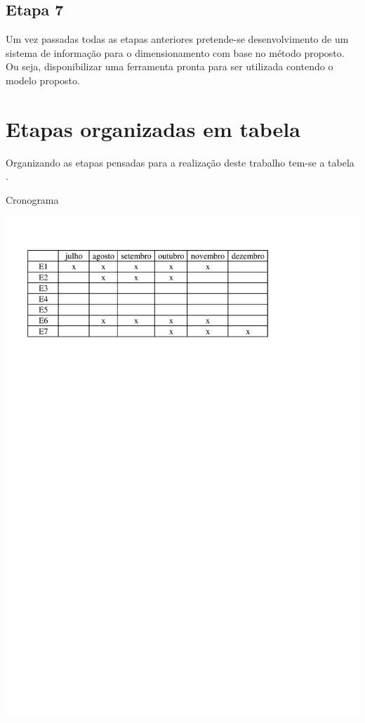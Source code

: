 \documentclass[
	12pt,				%
	openright,			%
	twoside,			%
	a4paper,			%
	english,			%
	french,				%
	spanish,			%
	brazil				%
	]{abntex2}
\begin{document}
\subsection{Etapa 7}
	Um vez passadas todas as etapas anteriores pretende-se desenvolvimento de um sistema de informação para o dimensionamento com base no método proposto. Ou seja, disponibilizar uma ferramenta pronta para ser utilizada contendo o modelo proposto.

\section{Etapas organizadas em tabela}

Organizando as etapas pensadas para a realização deste trabalho tem-se a tabela \label{cronograma}.

\begin{table}[htb]
	\caption{Cronograma}
	\label{cronograma}
	\center
	\includegraphics[clip, trim=1.3cm 22.5cm 5.4cm 2cm]{tudo/cronograma.pdf}
\end{table}
\end{document}
